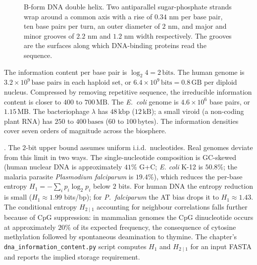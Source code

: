 \begin{figure}[h]
\centering

\caption{B-form DNA double helix. Two antiparallel sugar-phosphate
strands wrap around a common axis with a rise of $0.34$ nm per base
pair, ten base pairs per turn, an outer diameter of $2$ nm, and
major and minor grooves of $2.2$ nm and $1.2$ nm width respectively.
The grooves are the surfaces along which DNA-binding proteins read
the sequence.}
\label{fig:dna-geometry}
\end{figure}

The information content per base pair is $\log_2 4 = 2\,\text{bits}$.
The human genome is $3.2 \times 10^9\,\text{base pairs}$ in each haploid
set, or $6.4 \times 10^9\,\text{bits} = 0.8\,\text{GB}$ per diploid
nucleus. Compressed by removing repetitive sequence, the irreducible
information content is closer to $400$ to $700\,\text{MB}$. The
\emph{E.~coli} genome is $4.6 \times 10^6$ base pairs, or
$1.15\,\text{MB}$. The bacteriophage $\lambda$ has $48\,\text{kbp}$
($12\,\text{kB}$); a small viroid (a non-coding plant RNA) has
$250$ to $400\,\text{bases}$ ($60$ to $100\,\text{bytes}$). The
information densities cover seven orders of magnitude across the
biosphere.

. The $2$-bit upper bound
assumes uniform i.i.d.\ nucleotides. Real genomes deviate from this
limit in two ways. The single-nucleotide composition is GC-skewed
(human nuclear DNA is approximately $41\%$ G+C; \emph{E. coli} K-12
is $50.8\%$; the malaria parasite \emph{Plasmodium falciparum} is
$19.4\%$), which reduces the per-base entropy
$H_1 = -\sum_i p_i \log_2 p_i$ below $2$ bits. For human DNA the
entropy reduction is small ($H_1 \approx 1.99$ bits/bp); for
\emph{P.~falciparum} the AT bias drops it to $H_1 \approx 1.43$.
The conditional entropy $H_{2 \mid 1}$ accounting for neighbour
correlations falls further because of CpG suppression: in mammalian
genomes the CpG dinucleotide occurs at approximately $20\%$ of its
expected frequency, the consequence of cytosine methylation followed
by spontaneous deamination to thymine. The chapter's
\texttt{dna\_information\_content.py} script computes
$H_1$ and $H_{2 \mid 1}$ for an input FASTA and reports the
implied storage requirement.

